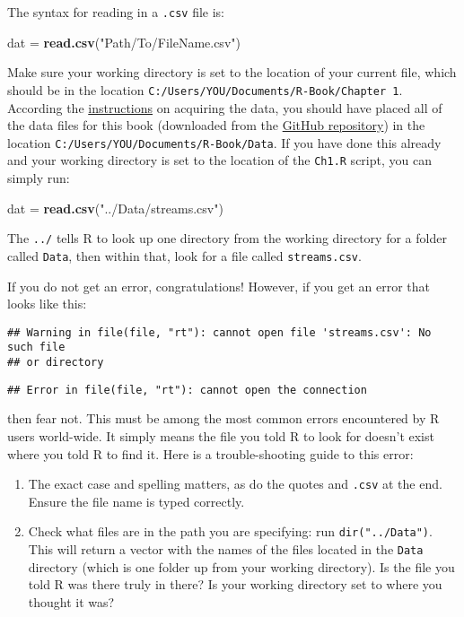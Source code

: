 \documentclass[]{book}
\newenvironment{Shaded}{\begin{snugshade}}{\end{snugshade}}
\newcommand{\KeywordTok}[1]{\textcolor[rgb]{0.13,0.29,0.53}{\textbf{#1}}}
\newcommand{\StringTok}[1]{\textcolor[rgb]{0.31,0.60,0.02}{#1}}
\newcommand{\NormalTok}[1]{#1}
\providecommand{\tightlist}{%
  \setlength{\itemsep}{0pt}\setlength{\parskip}{0pt}}
\theoremstyle{definition}
\theoremstyle{definition}
\theoremstyle{definition}
\theoremstyle{remark}
\begin{document}
The syntax for reading in a \texttt{.csv} file is:

\begin{Shaded}
\begin{Highlighting}[]
\NormalTok{dat =}\StringTok{ }\KeywordTok{read.csv}\NormalTok{(}\StringTok{"Path/To/FileName.csv"}\NormalTok{)}
\end{Highlighting}
\end{Shaded}

Make sure your working directory is set to the location of your current
file, which should be in the location
\texttt{C:/Users/YOU/Documents/R-Book/Chapter\ 1}. According the
\protect\hyperlink{data-sets}{instructions} on acquiring the data, you
should have placed all of the data files for this book (downloaded from
the \href{}{GitHub repository}) in the location
\texttt{C:/Users/YOU/Documents/R-Book/Data}. If you have done this
already and your working directory is set to the location of the
\texttt{Ch1.R} script, you can simply run:

\begin{Shaded}
\begin{Highlighting}[]
\NormalTok{dat =}\StringTok{ }\KeywordTok{read.csv}\NormalTok{(}\StringTok{"../Data/streams.csv"}\NormalTok{)}
\end{Highlighting}
\end{Shaded}

The \texttt{../} tells R to look up one directory from the working
directory for a folder called \texttt{Data}, then within that, look for
a file called \texttt{streams.csv}.

If you do not get an error, congratulations! However, if you get an
error that looks like this:

\begin{verbatim}
## Warning in file(file, "rt"): cannot open file 'streams.csv': No such file
## or directory
\end{verbatim}

\begin{verbatim}
## Error in file(file, "rt"): cannot open the connection
\end{verbatim}

then fear not. This must be among the most common errors encountered by
R users world-wide. It simply means the file you told R to look for
doesn't exist where you told R to find it. Here is a trouble-shooting
guide to this error:

\begin{enumerate}
\def\labelenumi{\arabic{enumi}.}
\tightlist
\item
  The exact case and spelling matters, as do the quotes and
  \texttt{.csv} at the end. Ensure the file name is typed correctly.
\item
  Check what files are in the path you are specifying: run
  \texttt{dir("../Data")}. This will return a vector with the names of
  the files located in the \texttt{Data} directory (which is one folder
  up from your working directory). Is the file you told R was there
  truly in there? Is your working directory set to where you thought it
  was?
\end{enumerate}
\end{document}

